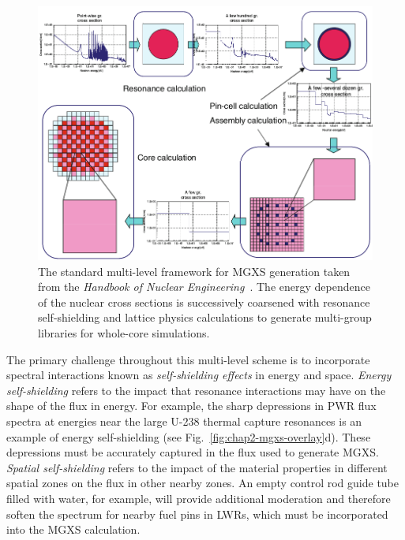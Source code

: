 \begin{figure}[h!]
  \centering
  \includegraphics[width=0.9\linewidth]{figures/mgxs/nuke-handbook-mgxs-process}
\caption[Standard multi-level framework for MGXS generation]{The standard multi-level framework for \ac{MGXS} generation taken from the \textit{Handbook of Nuclear Engineering}~\cite{cacuci2010handbook}. The energy dependence of the nuclear cross sections is successively coarsened with resonance self-shielding and lattice physics calculations to generate multi-group libraries for whole-core simulations.}
\label{fig:chap2-mgxs-process}
\end{figure}


The primary challenge throughout this multi-level scheme is to incorporate spectral interactions known as \textit{self-shielding effects} in energy and space. \textit{Energy self-shielding} refers to the impact that resonance interactions may have on the shape of the flux in energy. For example, the sharp depressions in \ac{PWR} flux spectra at energies near the large U-238 thermal capture resonances is an example of energy self-shielding (see Fig.~\ref{fig:chap2-mgxs-overlay}d). These depressions must be accurately captured in the flux used to generate \ac{MGXS}. \textit{Spatial self-shielding} refers to the impact of the material properties in different spatial zones on the flux in other nearby zones. An empty control rod guide tube filled with water, for example, will provide additional moderation and therefore soften the spectrum for nearby fuel pins in \ac{LWR}s, which must be incorporated into the \ac{MGXS} calculation.

